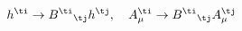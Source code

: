 \begin{equation} \label{hAtrafo}
h^{\ti}\rightarrow {B^{\ti}}_{\tj}h^{\tj}, \quad A_{\mu}^{\ti}\rightarrow
{B^{\ti}}_{\tj}A_{\mu}^{\tj}
\end{equation} 
